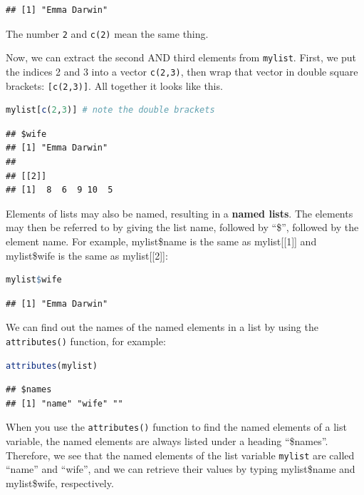 \documentclass[
]{book}
\newcommand{\passthrough}[1]{#1}
\begin{document}
\begin{lstlisting}
## [1] "Emma Darwin"
\end{lstlisting}

The number \passthrough{\lstinline!2!} and \passthrough{\lstinline!c(2)!} mean the same thing.

Now, we can extract the second AND third elements from \passthrough{\lstinline!mylist!}. First, we put the indices 2 and 3 into a vector \passthrough{\lstinline!c(2,3)!}, then wrap that vector in double square brackets: \passthrough{\lstinline![c(2,3)]!}. All together it looks like this.

\begin{lstlisting}[language=R]
mylist[c(2,3)] # note the double brackets
\end{lstlisting}

\begin{lstlisting}
## $wife
## [1] "Emma Darwin"
## 
## [[2]]
## [1]  8  6  9 10  5
\end{lstlisting}

Elements of lists may also be named, resulting in a \textbf{named lists}. The elements may then be referred to by giving the list name, followed by ``\$'', followed by the element name. For example, mylist\$name is the same as mylist{[}{[}1{]}{]} and mylist\$wife is the same as mylist{[}{[}2{]}{]}:

\begin{lstlisting}[language=R]
mylist$wife
\end{lstlisting}

\begin{lstlisting}
## [1] "Emma Darwin"
\end{lstlisting}

We can find out the names of the named elements in a list by using the \passthrough{\lstinline!attributes()!} function, for example:

\begin{lstlisting}[language=R]
attributes(mylist)
\end{lstlisting}

\begin{lstlisting}
## $names
## [1] "name" "wife" ""
\end{lstlisting}

When you use the \passthrough{\lstinline!attributes()!} function to find the named elements of a list variable, the named elements are always listed under a heading ``\$names''. Therefore, we see that the named elements of the list variable \passthrough{\lstinline!mylist!} are called ``name'' and ``wife'', and we can retrieve their values by typing mylist\$name and mylist\$wife, respectively.
\end{document}
